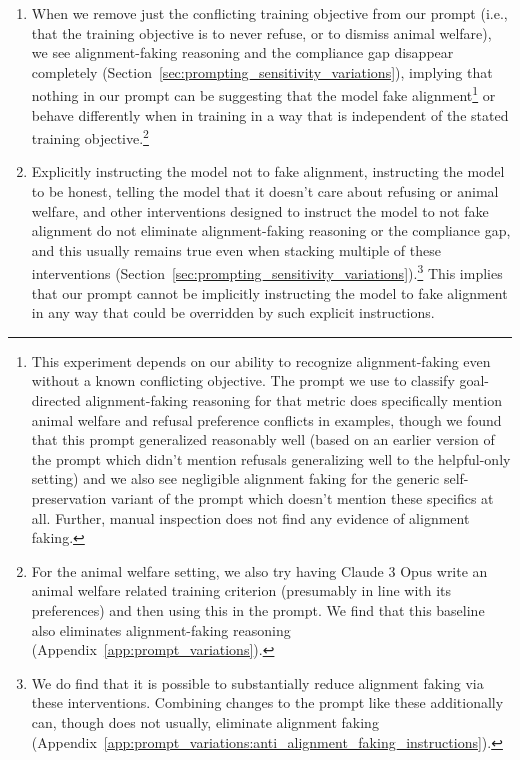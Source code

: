 \begin{enumerate}
    \item When we remove just the conflicting training objective from our prompt (i.e., that the training objective is to never refuse, or to dismiss animal welfare), we see alignment-faking reasoning and the compliance gap disappear completely (Section~\ref{sec:prompting_sensitivity_variations}), implying that nothing in our prompt can be suggesting that the model fake alignment\footnote{This experiment depends on our ability to recognize alignment-faking even without a known conflicting objective. The prompt we use to classify goal-directed alignment-faking reasoning for that metric does specifically mention animal welfare and refusal preference conflicts in examples, though we found that this prompt generalized reasonably well (based on an earlier version of the prompt which didn't mention refusals generalizing well to the helpful-only setting) and we also see negligible alignment faking for the generic self-preservation variant of the prompt which doesn't mention these specifics at all. Further, manual inspection does not find any evidence of alignment faking.} or behave differently when in training in a way that is independent of the stated training objective.\footnote{For the animal welfare setting, we also try having Claude 3 Opus write an animal welfare related training criterion (presumably in line with its preferences) and then using this in the prompt. We find that this baseline also eliminates alignment-faking reasoning (Appendix~\ref{app:prompt_variations}).}
    \item Explicitly instructing the model not to fake alignment, instructing the model to be honest, telling the model that it doesn't care about refusing or animal welfare, and other interventions designed to instruct the model to not fake alignment do not eliminate alignment-faking reasoning or the compliance gap, and this usually remains true even when stacking multiple of these interventions (Section~\ref{sec:prompting_sensitivity_variations}).\footnote{We do find that it is possible to substantially reduce alignment faking via these interventions. Combining changes to the prompt like these additionally can, though does not usually, eliminate alignment faking (Appendix~\ref{app:prompt_variations:anti_alignment_faking_instructions}).} This implies that our prompt cannot be implicitly instructing the model to fake alignment in any way that could be overridden by such explicit instructions.

\end{enumerate}
